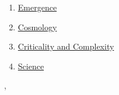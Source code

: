 \documentclass[11pt]{article}
\renewcommand{\today}{\shortmonthname[\the\month] \the \day,  \the\year}
\begin{document}
\begin{multicols}{2}
\begin{enumerate}
		\item \href{https://mp.weixin.qq.com/s/d99CrrtLMv4DA_jWz9Stwg}{Emergence} %
		\item \href{https://mp.weixin.qq.com/s/uZF7VSSQGM5D0UkyWdj-7w}{Cosmology}	%
		\item \href{https://mp.weixin.qq.com/s/yM_Ls-txzcExiOGIGeHvcw}{Criticality and Complexity}	%
		\item \href{https://mp.weixin.qq.com/s/-oen5-g8iHpA6tQfV5Sgzg}{Science}	%
	\end{enumerate}
\end{multicols}






%
\begin{flushright}
	\tiny \today 
\end{flushright}
\end{document}
